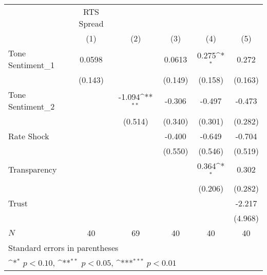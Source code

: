 {
\def\sym#1{\ifmmode^{#1}\else\(^{#1}\)\fi}
\begin{tabular}{l*{5}{c}}
\hline\hline
            &  RTS Spread         &                     &                     &                     &                     \\
            &\multicolumn{1}{c}{(1)}         &\multicolumn{1}{c}{(2)}         &\multicolumn{1}{c}{(3)}         &\multicolumn{1}{c}{(4)}         &\multicolumn{1}{c}{(5)}         \\
\hline
Tone Sentiment\_{1}&      0.0598         &                     &      0.0613         &       0.275\sym{*}  &       0.272         \\
            &     (0.143)         &                     &     (0.149)         &     (0.158)         &     (0.163)         \\
[1em]
Tone Sentiment\_{2}&                     &      -1.094\sym{**} &      -0.306         &      -0.497         &      -0.473         \\
            &                     &     (0.514)         &     (0.340)         &     (0.301)         &     (0.282)         \\
[1em]
Rate Shock  &                     &                     &      -0.400         &      -0.649         &      -0.704         \\
            &                     &                     &     (0.550)         &     (0.546)         &     (0.519)         \\
[1em]
Transparency&                     &                     &                     &       0.364\sym{*}  &       0.302         \\
            &                     &                     &                     &     (0.206)         &     (0.282)         \\
[1em]
Trust       &                     &                     &                     &                     &      -2.217         \\
            &                     &                     &                     &                     &     (4.968)         \\
\hline
\(N\)       &          40         &          69         &          40         &          40         &          40         \\
\hline\hline
\multicolumn{6}{l}{\footnotesize Standard errors in parentheses}\\
\multicolumn{6}{l}{\footnotesize \sym{*} \(p<0.10\), \sym{**} \(p<0.05\), \sym{***} \(p<0.01\)}\\
\end{tabular}
}
